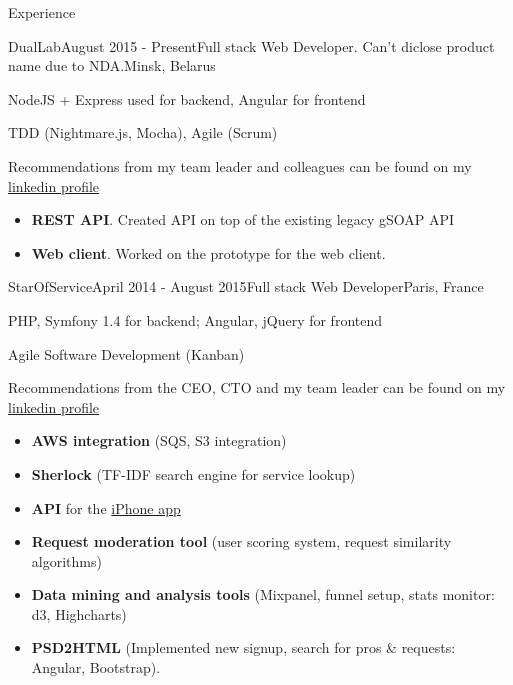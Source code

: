 \documentclass{resume} %
\begin{document}

\begin{rSection}{Experience}

\begin{rSubsection}{DualLab}{August 2015 - Present}{Full stack Web Developer. Can't diclose product name due to NDA.}{Minsk, Belarus}
\item NodeJS + Express used for backend, Angular for frontend 
\item TDD (Nightmare.js, Mocha), Agile (Scrum)
\item Recommendations from my team leader and colleagues can be found on my \href{http://linkedin.com/in/mikhalchenkoa}{linkedin profile}


\begin{itemize}[leftmargin=*,label={$+$}]
  \item {\bf REST API}.  Created API on top of the existing legacy gSOAP API
  \item {\bf Web client}. Worked on the prototype for the web client.
\end{itemize}

\end{rSubsection}


\begin{rSubsection}{StarOfService}{April 2014 - August 2015}{Full stack Web Developer}{Paris, France}
\item PHP, Symfony 1.4 for backend; Angular, jQuery for frontend
\item Agile Software Development (Kanban)
\item Recommendations from the CEO, CTO and my team leader can be found on my \href{http://linkedin.com/in/mikhalchenkoa}{linkedin profile}


\begin{itemize}[leftmargin=*,label={$+$}]
  \item {\bf AWS integration} (SQS, S3 integration)
  \item {\bf Sherlock} (TF-IDF search engine for service lookup)
  \item {\bf API} for the \href{https://itunes.apple.com/fr/app/starofservice/id948344674?mt=8}{iPhone app}
  \item {\bf Request moderation tool} (user scoring system, request similarity algorithms)
  \item {\bf Data mining and analysis tools} (Mixpanel, funnel setup, stats monitor: d3, Highcharts)
  \item {\bf PSD2HTML} (Implemented new signup, search for pros \& requests: Angular, Bootstrap).
\end{itemize}


\end{rSubsection}
\end{rSection}
\end{document}
